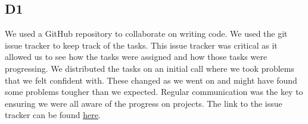 \subsection*{D1}
    We used a GitHub repository to collaborate on writing code. We used the git issue tracker to keep track of the tasks. This issue tracker was critical as it allowed us to see how the tasks were assigned and how those tasks were progressing. We distributed the tasks on an initial call where we took problems that we felt confident with. These changed as we went on and might have found some problems tougher than we expected. Regular communication was the key to ensuring we were all aware of the progress on projects. The link to the issue tracker can be found  \href{https://github.com/drlim2u/ELE2024-Control-Coursework/issues}{here}.